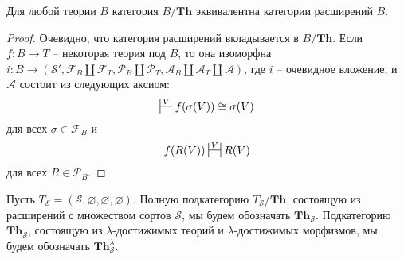 \documentclass[reqno]{amsart}
\theoremstyle{definition}
\theoremstyle{remark}
\newcommand{\bcat}[1]{\mathbf{#1}}
\newcommand{\Th}{\bcat{Th}}
\begin{document}
\begin{lem}[th-ext]
Для любой теории $B$ категория $B/\Th$ эквивалентна категории расширений $B$.
\end{lem}
\begin{proof}
Очевидно, что категория расширений вкладывается в $B/\Th$.
Если $f : B \to T$ -- некоторая теория под $B$, то она изоморфна $i : B \to (\mathcal{S}', \mathcal{F}_B \amalg \mathcal{F}_T, \mathcal{P}_B \amalg \mathcal{P}_T, \mathcal{A}_B \amalg \mathcal{A}_T \amalg \mathcal{A})$,
где $i$ -- очевидное вложение, и $\mathcal{A}$ состоит из следующих аксиом:
\[ \sststile{}{V} f(\sigma(V)) \cong \sigma(V) \]
для всех $\sigma \in \mathcal{F}_B$ и
\[ f(R(V)) \ssststile{}{V} R(V) \]
для всех $R \in \mathcal{P}_B$.
\end{proof}

Пусть $T_\mathcal{S} = (\mathcal{S},\varnothing,\varnothing,\varnothing)$.
Полную подкатегорию $T_\mathcal{S}/\Th$, состоящую из расширений с множеством сортов $\mathcal{S}$, мы будем обозначать $\Th_\mathcal{S}$.
Подкатегорию $\Th_\mathcal{S}$, состоящую из $\lambda$-достижимых теорий и $\lambda$-достижимых морфизмов, мы будем обозначать $\Th_\mathcal{S}^\lambda$.
\end{document}
